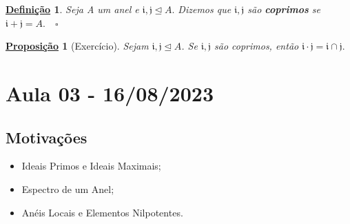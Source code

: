 \documentclass{article}
\newtheorem*{def*}{\underline{Defini\c c\~ao}}
\newtheorem*{prop*}{\underline{Proposi\c c\~ao}}
\begin{document}
\begin{def*}
  Seja A um anel e \(\mathfrak{i}, \mathfrak{j}\trianglelefteq{A}.\) Dizemos que \(\mathfrak{i}, \mathfrak{j}\) são \textbf{coprimos}
  se \(\mathfrak{i} + \mathfrak{j} = A.\quad\square\)
\end{def*}
\begin{prop*}[Exercício]
  Sejam \(\mathfrak{i}, \mathfrak{j}\trianglelefteq{A}\). Se \(\mathfrak{i}, \mathfrak{j}\) são coprimos, então \(\mathfrak{i}\cdot \mathfrak{j} = \mathfrak{i}\cap \mathfrak{j}.\)
\end{prop*}
\newpage

\section{Aula 03 - 16/08/2023}
\subsection{Motivações}
\begin{itemize}
  \item Ideais Primos e Ideais Maximais;
  \item Espectro de um Anel;
  \item Anéis Locais e Elementos Nilpotentes.
\end{itemize}
\end{document}
